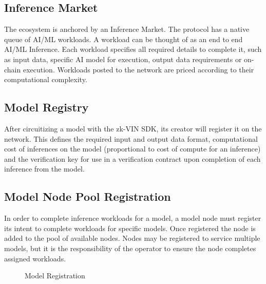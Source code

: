 \documentclass[conference]{IEEEtran}
\begin{document}
\subsection{Inference Market}
The ecosystem is anchored by an Inference Market. The protocol has a native queue of AI/ML workloads. A workload can be thought of as an end to end AI/ML Inference. Each workload specifies all required details to complete it, such as input data, specific AI model for execution, output data requirements or on-chain execution. Workloads posted to the network are priced according to their computational complexity.

\subsection{Model Registry}
After circuitizing a model with the zk-VIN SDK, its creator will register it on the network. This defines the required input and output data format, computational cost of inferences on the model (proportional to cost of compute for an inference) and the verification key for use in a verification contract upon completion of each inference from the model.

\subsection{Model Node Pool Registration}
In order to complete inference workloads for a model, a model node must register its intent to complete workloads for specific models. Once registered the node is added to the pool of available nodes. Nodes may be registered to service multiple models, but it is the responsibility of the operator to ensure the node completes assigned workloads.

\begin{figure}[!ht]
    \centering
{}
    \caption{Model Registration}
    \label{fig:Fig 3}
\end{figure}
\end{document}

